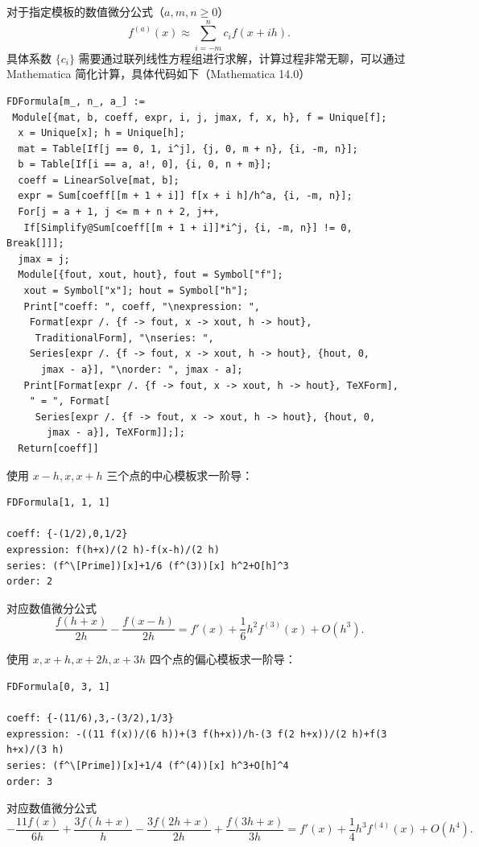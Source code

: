 对于指定模板的数值微分公式（$a,m,n \ge 0$）
\[
    f^{(a)}(x) \approx \sum_{i=-m}^n c_i f(x + i h).
\]
具体系数 $\{c_i\}$ 需要通过联列线性方程组进行求解，计算过程非常无聊，可以通过 Mathematica 简化计算，具体代码如下（Mathematica 14.0）
\begin{lstlisting}
FDFormula[m_, n_, a_] :=
 Module[{mat, b, coeff, expr, i, j, jmax, f, x, h}, f = Unique[f];
  x = Unique[x]; h = Unique[h];
  mat = Table[If[j == 0, 1, i^j], {j, 0, m + n}, {i, -m, n}];
  b = Table[If[i == a, a!, 0], {i, 0, n + m}];
  coeff = LinearSolve[mat, b];
  expr = Sum[coeff[[m + 1 + i]] f[x + i h]/h^a, {i, -m, n}];
  For[j = a + 1, j <= m + n + 2, j++,
   If[Simplify@Sum[coeff[[m + 1 + i]]*i^j, {i, -m, n}] != 0, Break[]]];
  jmax = j;
  Module[{fout, xout, hout}, fout = Symbol["f"];
   xout = Symbol["x"]; hout = Symbol["h"];
   Print["coeff: ", coeff, "\nexpression: ",
    Format[expr /. {f -> fout, x -> xout, h -> hout},
     TraditionalForm], "\nseries: ",
    Series[expr /. {f -> fout, x -> xout, h -> hout}, {hout, 0,
      jmax - a}], "\norder: ", jmax - a];
   Print[Format[expr /. {f -> fout, x -> xout, h -> hout}, TeXForm],
    " = ", Format[
     Series[expr /. {f -> fout, x -> xout, h -> hout}, {hout, 0,
       jmax - a}], TeXForm]];];
  Return[coeff]]
\end{lstlisting}

\begin{example}
    使用 $x-h,x,x+h$ 三个点的中心模板求一阶导：
    \begin{lstlisting}[numbers=none]
FDFormula[1, 1, 1]

coeff: {-(1/2),0,1/2}
expression: f(h+x)/(2 h)-f(x-h)/(2 h)
series: (f^\[Prime])[x]+1/6 (f^(3))[x] h^2+O[h]^3
order: 2
    \end{lstlisting}
    对应数值微分公式
    \[
        \frac{f(h+x)}{2 h}-\frac{f(x-h)}{2 h}=f'(x)+\frac{1}{6} h^2 f^{(3)}(x)+O\left(h^3\right).
    \]
\end{example}


\begin{example}
    使用 $x,x+h,x+2h,x+3h$ 四个点的偏心模板求一阶导：
    \begin{lstlisting}[numbers=none]
FDFormula[0, 3, 1]

coeff: {-(11/6),3,-(3/2),1/3}
expression: -((11 f(x))/(6 h))+(3 f(h+x))/h-(3 f(2 h+x))/(2 h)+f(3 h+x)/(3 h)
series: (f^\[Prime])[x]+1/4 (f^(4))[x] h^3+O[h]^4
order: 3
    \end{lstlisting}
    对应数值微分公式
    \[
        -\frac{11 f(x)}{6 h}+\frac{3 f(h+x)}{h}-\frac{3 f(2 h+x)}{2 h}+\frac{f(3 h+x)}{3 h}=f'(x)+\frac{1}{4} h^3 f^{(4)}(x)+O\left(h^4\right).
    \]
\end{example}


